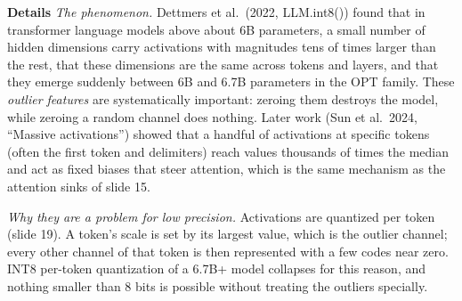 \documentclass[11pt,letterpaper]{article}
\newcommand{\para}[1]{\medskip\noindent\textbf{#1}\quad}
\begin{document}
\para{Details} \emph{The phenomenon.} Dettmers et al.\ (2022, LLM.int8()) found that in transformer language models above about 6B parameters, a small number of hidden dimensions carry activations with magnitudes tens of times larger than the rest, that these dimensions are the same across tokens and layers, and that they emerge suddenly between 6B and 6.7B parameters in the OPT family. These \emph{outlier features} are systematically important: zeroing them destroys the model, while zeroing a random channel does nothing. Later work (Sun et al.\ 2024, ``Massive activations'') showed that a handful of activations at specific tokens (often the first token and delimiters) reach values thousands of times the median and act as fixed biases that steer attention, which is the same mechanism as the attention sinks of slide 15.

\emph{Why they are a problem for low precision.} Activations are quantized per token (slide 19). A token's scale is set by its largest value, which is the outlier channel; every other channel of that token is then represented with a few codes near zero. INT8 per-token quantization of a 6.7B+ model collapses for this reason, and nothing smaller than 8 bits is possible without treating the outliers specially.
\end{document}
